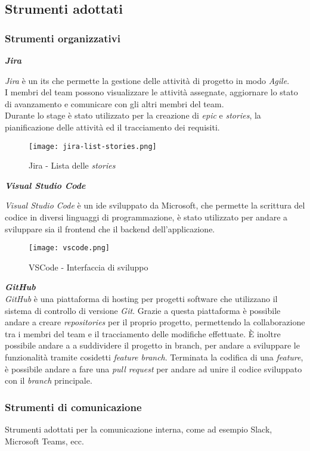 \pagebreak
\subsection{Strumenti adottati}
\label{sez:strumenti-adottati}

\subsubsection{Strumenti organizzativi}
\label{sez:strumenti-organizzativi}

\noindent \textbf{\textit{Jira\\}} 

\noindent \textit{Jira} è un \gls{its} che permette la gestione delle attività di progetto in modo \textit{Agile}.\\
I membri del team possono visualizzare le attività assegnate, aggiornare lo stato di avanzamento e comunicare con gli altri membri del team. \\
Durante lo stage è stato utilizzato per la creazione di \textit{epic} e \textit{stories}, la pianificazione delle attività ed il tracciamento dei requisiti.

\begin{figure}[h]
    \label{fig:jira-list-stories}
    \caption{Jira - Lista delle \textit{stories}}
    \centering
    \texttt{[image: jira-list-stories.png]}
\end{figure}

\pagebreak
\noindent \textbf{\textit{Visual Studio Code\\}}

\noindent \textit{Visual Studio Code} è un \gls{ide} sviluppato da Microsoft, che permette la scrittura del codice in diversi linguaggi di programmazione, è stato utilizzato per andare
a sviluppare sia il \gls{frontend} che il \gls{backend} dell'applicazione.\\

\begin{figure}[h!]
    \label{fig:vscode}
    \caption{VSCode - Interfaccia di sviluppo} 
    \centering
    \texttt{[image: vscode.png]}
\end{figure}

\noindent \textbf{\textit{GitHub\\}}
\noindent \textit{GitHub} è una piattaforma di hosting per progetti software che utilizzano il sistema di controllo di versione \textit{Git}.
Grazie a questa piattaforma è possibile andare a creare \textit{repositories} per il proprio progetto, permettendo la collaborazione tra i membri del team e il tracciamento delle modifiche effettuate.
È inoltre possibile andare a a suddividere il progetto in \gls{branch}, per andare a sviluppare le funzionalità tramite cosidetti \textit{feature branch}.
Terminata la codifica di una \textit{feature}, è possibile andare a fare una \textit{pull request} per andare ad unire il codice sviluppato con il \textit{branch} principale.


\subsubsection{Strumenti di comunicazione}
\label{sez:strumenti-comunicazione}

Strumenti adottati per la comunicazione interna, come ad esempio Slack, Microsoft Teams, ecc.